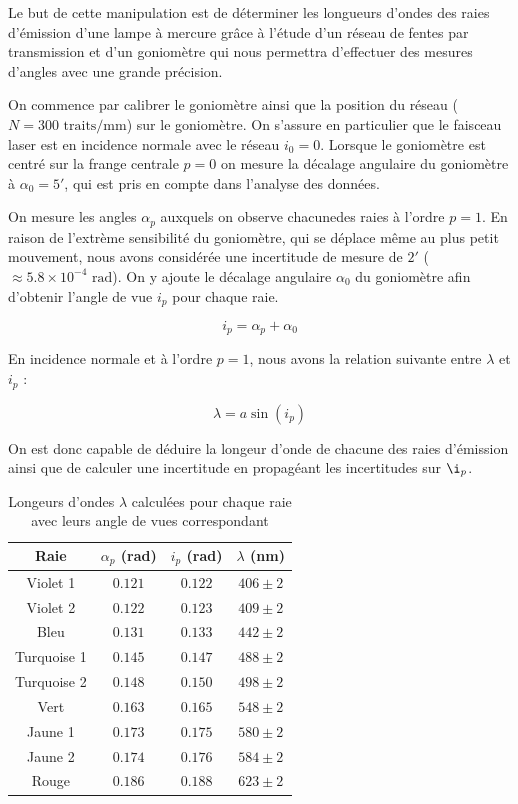 \documentclass{article}
\begin{document}
Le but de cette manipulation est de déterminer les longueurs d’ondes des raies d'émission d’une lampe à mercure grâce à l’étude d’un réseau 
de fentes par transmission et d’un goniomètre qui nous permettra d’effectuer des mesures d’angles avec une grande précision.

On commence par calibrer le goniomètre ainsi que la position du réseau ($N=300 \textrm{ traits/mm}$) sur le goniomètre. On s'assure en particulier que le faisceau laser est en incidence normale avec le réseau $i_0 = 0$.
Lorsque le goniomètre est centré sur la frange centrale $p=0$ on mesure la décalage angulaire du goniomètre à $\alpha_0 = 5'$, qui est pris en compte dans l'analyse des données.

On mesure les angles $\alpha_p$ auxquels on observe chacunedes raies à l'ordre $p=1$. En raison de l'extrème sensibilité du goniomètre, qui se déplace même au plus petit mouvement, 
nous avons considérée une incertitude de mesure de $2'$ ($\approx 5.8 \times 10^{-4}\textrm{ rad}$). On y ajoute le décalage angulaire $\alpha_0$ du goniomètre afin d'obtenir 
l'angle de vue $i_p$ pour chaque raie.

$$i_p = \alpha_p + \alpha_0$$

En incidence normale et à l'ordre $p=1$, nous avons la relation suivante entre $\lambda$ et $i_p$ :

\begin{equation}
    \lambda = a\sin(i_p)
\end{equation}

On est donc capable de déduire la longeur d'onde de chacune des raies d'émission ainsi que de calculer une 
incertitude en propagéant les incertitudes sur $\i_p$.

\begin{table}[H]
    \begin{center}
        \begin{tabular}{|c|c|c|c|}
        \hline
        Raie     & $\alpha_p$ (rad) & $i_p$ (rad) & $\lambda$ (nm) \\
        \hline
        Violet 1    & $0.121$   & $0.122$   & $406 \pm 2$ \\
        Violet 2    & $0.122$   & $0.123$   & $409 \pm 2$ \\
        Bleu        & $0.131$   & $0.133$   & $442 \pm 2$ \\
        Turquoise 1 & $0.145$   & $0.147$   & $488 \pm 2$ \\
        Turquoise 2 & $0.148$   & $0.150$   & $498 \pm 2$ \\
        Vert        & $0.163$   & $0.165$   & $548 \pm 2$ \\
        Jaune 1     & $0.173$   & $0.175$   & $580 \pm 2$ \\
        Jaune 2     & $0.174$   & $0.176$   & $584 \pm 2$ \\
        Rouge       & $0.186$   & $0.188$   & $623 \pm 2$ \\
        \hline
    \end{tabular}
    \end{center}
    \caption{Longeurs d'ondes $\lambda$ calculées pour chaque raie avec leurs angle de vues correspondant}
\end{table}
\end{document}
